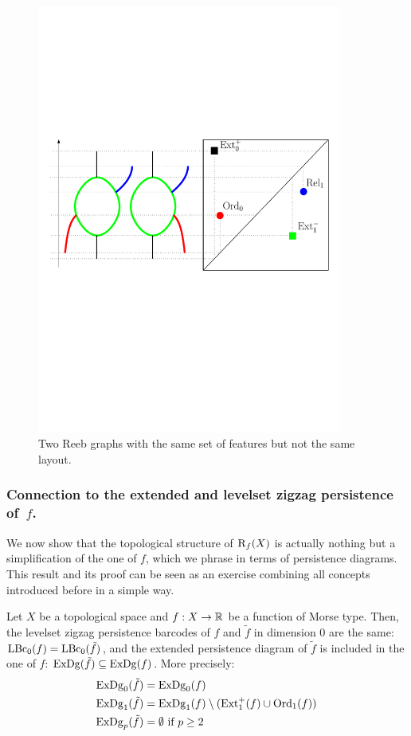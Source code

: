 \begin{figure}[htb]
\centering
\includegraphics[width=10cm]{figures/CounterExampleMetric}
\caption{Two Reeb graphs with the same set of features but not the same layout.}
\label{fig:Reeb_struct}
\end{figure}



\subsubsection*{Connection to the extended and levelset zigzag persistence of~$f$.}
\label{sec:topologyReeb}

We now show that the topological structure of $\mathrm{R}_f(X)$ is actually nothing but a simplification 
of the one of $f$, which we phrase in terms of persistence diagrams. 
This result and its proof can be seen as an exercise combining all concepts introduced before in a simple way.

\begin{thm}\label{thm:pdreeb}
Let $X$ be a topological space and
$f:X\rightarrow\mathbb{R}$ be a function of Morse type.
Then, the levelset zigzag persistence barcodes of $f$ and $\tilde f$ in dimension 0 are the same: $\mathrm{LBc}_0(f)=\mathrm{LBc}_0(\tilde f)$,
and the extended persistence diagram of $\tilde f$ is included in the one of $f$: $\mathrm{ExDg}(\tilde{f})\subseteq \mathrm{ExDg}(f)$.
More precisely:
\begin{align*}
\mathrm{ExDg}_0(\tilde{f}) &= \mathrm{ExDg}_0(f) \\
\mathrm{ExDg}_1(\tilde{f}) &= \mathrm{ExDg}_1(f)\setminus(\mathrm{Ext}^+_1(f)\cup\mathrm{Ord}_1(f)) \\
\mathrm{ExDg}_p(\tilde{f}) &= \emptyset\text{  if }p\geq 2
\end{align*}
\end{thm}

